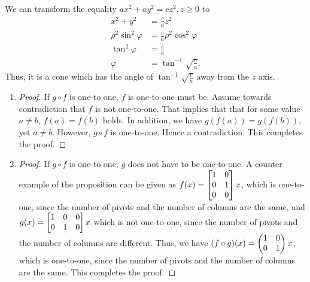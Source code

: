 \documentclass[8pt]{article}
\begin{document}
\begin{Answer}[number=24]
  We can transform the equality $ax^2+ay^2=cz^2, z\ge 0$ to
  \begin{align*}
    x^2+y^2&=\frac{c}{a}z^2 \\
    \rho^2 \sin^2\varphi&=\frac{c}{a}\rho^2\cos^2\varphi \\
    \tan^2\varphi&=\frac{c}{a} \\
    \varphi&=\tan^{-1}\sqrt{\frac{c}{a}}.
  \end{align*}
  Thus, it is a cone which has the angle of $\tan^{-1}\sqrt{\frac{c}{a}}$ away
  from the $z$ axis.
\end{Answer}

\begin{Answer}[number=25]
  \begin{enumerate}
    \item \begin{proof}
      If $g\circ f$ is one-to one, $f$ is one-to-one must be. Assume towards
      contradiction that $f$ is not one-to-one. That implies that that for some
      value $a\ne b$, $f(a)=f(b)$ holds. In addition, we have $g(f(a)) =
      g(f(b))$, yet $a\ne b$. However, $g\circ f$ is one-to-one. Hence a
      contradiction. This completes the proof.
    \end{proof}
    \item \begin{proof}
        If $g\circ f$ is one-to one, $g$ does not have to be one-to-one. A
        counter example of the proposition can be given as
        \(f(x) = \begin{bmatrix}
          \imat{2} \\ 0 & 0
        \end{bmatrix}x\), which is one-to-one, since the number of
        pivots and the number of columns are the same, and \(g(x) = \begin{bmatrix}
          \mqty{\imat{2}} & \mqty{0\\0}
        \end{bmatrix}x\) which is not one-to-one, since the number of pivots
        and the number of columns are different. Thus, we have $(f\circ g) (x)
        = \begin{pmatrix}
          \imat{2}
        \end{pmatrix}x$, which is one-to-one, since the number of
        pivots and the number of columns are the same. This completes the
        proof.
    \end{proof}
  \end{enumerate}
\end{Answer}
\end{document}

